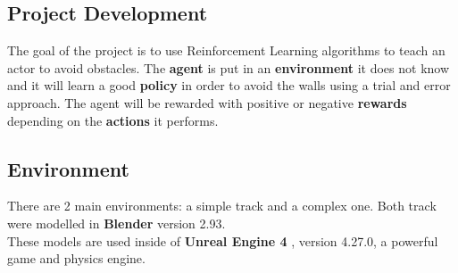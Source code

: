 \documentclass[14pt]{extarticle}
\def\sp{\vspace{5pt}}
\begin{document}
\newpage
\begin{center}
	\section{Project Development}
	\sp
\end{center}
\begin{flushleft}
	The goal of the project is to use Reinforcement Learning algorithms to teach an actor to avoid obstacles. The \textbf{agent} is put in an \textbf{environment} it does not know and it will learn a good \textbf{policy} in order to avoid the walls using a trial and error approach. The agent will be rewarded with positive or negative \textbf{rewards} depending on the \textbf{actions} it performs. 
	
	\subsection{Environment}
	\sp
	There are 2 main environments: a simple track and a complex one. Both track were modelled in \textbf{Blender} version 2.93\cite{Blender}. \\
	These models are used inside of \textbf{Unreal Engine 4} \cite{UE4}, version 4.27.0, a powerful game and physics engine.
	

\end{flushleft}
\end{document}
